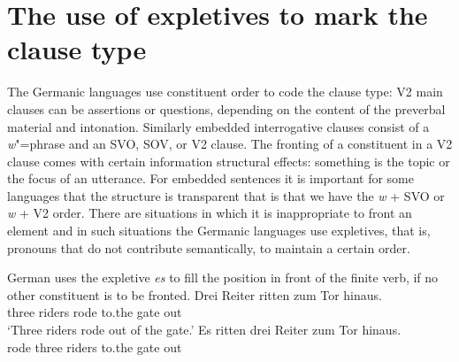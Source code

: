 \section{The use of expletives to mark the clause type}

The Germanic languages use constituent order to code the clause type: V2 main clauses can be
assertions or questions, depending on the content of the preverbal material and
intonation. Similarly embedded interrogative clauses consist of a \emph{w}"=phrase and an SVO, SOV,
or V2 clause. The fronting of a constituent in a V2 clause comes with certain information structural
effects: something is the topic or the focus of an utterance. For embedded sentences it is important
for some languages that the structure is transparent that is that we have the \emph{w} + SVO or
\emph{w} + V2 order. There are situations in which it is inappropriate to front an element and in
such situations the Germanic languages use expletives, that is, pronouns that do not contribute
semantically, to maintain a certain order.

German uses the expletive \emph{es} to fill the position in front of the finite verb, if no other
constituent is to be fronted.
\eal
\ex 
\gll Drei Reiter ritten zum Tor hinaus.\\
     three riders rode  to.the gate out\\\german
\glt `Three riders rode out of the gate.'
\ex 
\gll Es ritten drei Reiter zum Tor hinaus.\\
     \expl{} rode   three riders to.the gate out\\
\zl

